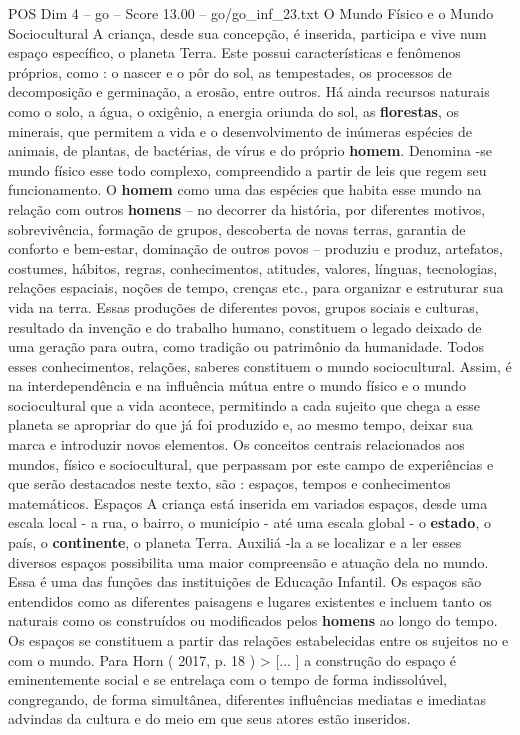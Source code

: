 \begin{textsample}{POS Dim 4 – go – Score 13.00 – go/go\_inf\_23.txt}
O Mundo Físico e o Mundo Sociocultural A criança, desde sua concepção, é inserida, participa e vive num espaço específico, o planeta Terra.
Este possui características e fenômenos próprios, como : o nascer e o pôr do sol, as tempestades, os processos de decomposição e germinação, a erosão, entre outros.
Há ainda recursos naturais como o solo, a água, o oxigênio, a energia oriunda do sol, as \textbf{florestas}, os minerais, que permitem a vida e o desenvolvimento de inúmeras espécies de animais, de plantas, de bactérias, de vírus e do próprio \textbf{homem}.
Denomina -se mundo físico esse todo complexo, compreendido a partir de leis que regem seu funcionamento.
O \textbf{homem} como uma das espécies que habita esse mundo na relação com outros \textbf{homens} – no decorrer da história, por diferentes motivos, sobrevivência, formação de grupos, descoberta de novas terras, garantia de conforto e bem-estar, dominação de outros povos – produziu e produz, artefatos, costumes, hábitos, regras, conhecimentos, atitudes, valores, línguas, tecnologias, relações espaciais, noções de tempo, crenças etc., para organizar e estruturar sua vida na terra.
Essas produções de diferentes povos, grupos sociais e culturas, resultado da invenção e do trabalho humano, constituem o legado deixado de uma geração para outra, como tradição ou patrimônio da humanidade.
Todos esses conhecimentos, relações, saberes constituem o mundo sociocultural.
Assim, é na interdependência e na influência mútua entre o mundo físico e o mundo sociocultural que a vida acontece, permitindo a cada sujeito que chega a esse planeta se apropriar do que já foi produzido e, ao mesmo tempo, deixar sua marca e introduzir novos elementos.
Os conceitos centrais relacionados aos mundos, físico e sociocultural, que perpassam por este campo de experiências e que serão destacados neste texto, são : espaços, tempos e conhecimentos matemáticos.
Espaços A criança está inserida em variados espaços, desde uma escala local - a rua, o bairro, o município - até uma escala global - o \textbf{estado}, o país, o \textbf{continente}, o planeta Terra.
Auxiliá -la a se localizar e a ler esses diversos espaços possibilita uma maior compreensão e atuação dela no mundo.
Essa é uma das funções das instituições de Educação Infantil.
Os espaços são entendidos como as diferentes paisagens e lugares existentes e incluem tanto os naturais como os construídos ou modificados pelos \textbf{homens} ao longo do tempo.
Os espaços se constituem a partir das relações estabelecidas entre os sujeitos no e com o mundo.
Para Horn ( 2017, p. 18 ) > [... ] a construção do espaço é eminentemente social e se entrelaça com o tempo de forma indissolúvel, congregando, de forma simultânea, diferentes influências mediatas e imediatas advindas da cultura e do meio em que seus atores estão inseridos.

\end{textsample}
